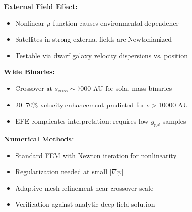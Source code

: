 \begin{tcolorbox}[colback=green!5!white, colframe=green!60!black, title=Extended Phenomenology Summary]
\textbf{External Field Effect:}
\begin{itemize}[nosep]
\item Nonlinear $\mu$-function causes environmental dependence
\item Satellites in strong external fields are Newtonianized
\item Testable via dwarf galaxy velocity dispersions vs. position
\end{itemize}

\textbf{Wide Binaries:}
\begin{itemize}[nosep]
\item Crossover at $s_{\mathrm{cross}} \sim 7000$ AU for solar-mass binaries
\item 20--70\% velocity enhancement predicted for $s > 10000$ AU
\item EFE complicates interpretation; requires low-$g_{\mathrm{gal}}$ samples
\end{itemize}

\textbf{Numerical Methods:}
\begin{itemize}[nosep]
\item Standard FEM with Newton iteration for nonlinearity
\item Regularization needed at small $|\nabla\psi|$
\item Adaptive mesh refinement near crossover scale
\item Verification against analytic deep-field solution
\end{itemize}
\end{tcolorbox}
